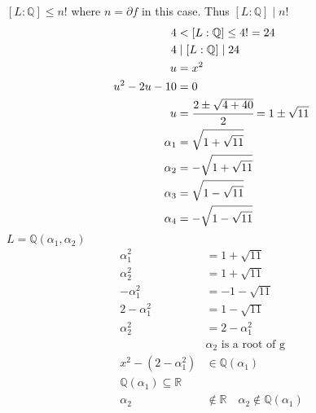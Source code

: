 \documentclass{article}
\begin{document}
$[L: \mathbb{Q}] \leq n!$ where $n = \partial f$ in this case. Thus $[L:\mathbb{Q}] \mid n!$ \\ 
\begin{align*}
    4 & < [L:\mathbb{Q}] \leq 4! = 24 \\
    4 &\mid [L:\mathbb{Q}]  \mid 24 \\
    u & = x^2 \\ 
    u^2 - 2u - 10 & = 0 \\
    u & = \cfrac{2 \pm \sqrt{4 + 40}}{2} = 1 \pm \sqrt{11} \\
    \alpha_1 & = \sqrt{1 + \sqrt{11}} \\
    \alpha_2 & = -\sqrt{1 + \sqrt{11}} \\
    \alpha_3 & = \sqrt{1 - \sqrt{11}} \\
    \alpha_4 & = -\sqrt{1 - \sqrt{11}} \\
\end{align*}
$L = \mathbb{Q}(\alpha_1, \alpha_2)$
\begin{align*}
    \alpha_1^2 & = 1 + \sqrt{11} \\
    \alpha_2^2 & = 1 + \sqrt{11} \\
    -\alpha_1^2 & = -1 - \sqrt{11} \\
    2 - \alpha_1^2 & = 1 - \sqrt{11} \\
    \alpha_2^2 & = 2 - \alpha_1^2 \\
   & \text{$\alpha_2 $ is a root of g} \\ 
   x^2 - (2-\alpha_1^2) &\in \mathbb{Q}(\alpha_1) \\
   \mathbb{Q}(\alpha_1) \subseteq \mathbb{R} \\ 
   \alpha_2 &\not \in \mathbb{R} \quad \alpha_2 \not \in \mathbb{Q}(\alpha_1)
\end{align*}
\end{document}
